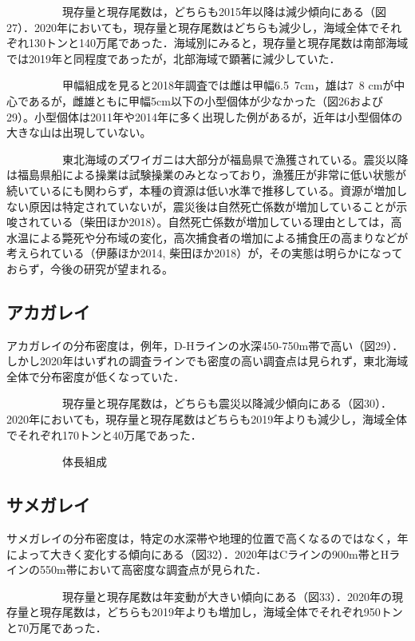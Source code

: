 \documentclass[11pt]{article} %
\begin{document}
\begin{linenumbers}
\ \ \ \ \ \ \ \ \ \ 
現存量と現存尾数は，どちらも2015年以降は減少傾向にある（図27）．2020年においても，現存量と現存尾数はどちらも減少し，海域全体でそれぞれ130トンと140万尾であった．海域別にみると，現存量と現存尾数は南部海域では2019年と同程度であったが，北部海域で顕著に減少していた．

\ \ \ \ \ \ \ \ \ \ 
甲幅組成を見ると2018年調査では雌は甲幅6.5~7cm，雄は7~8 cmが中心であるが，雌雄ともに甲幅5cm以下の小型個体が少なかった（図26および29）。小型個体は2011年や2014年に多く出現した例があるが，近年は小型個体の大きな山は出現していない。

\ \ \ \ \ \ \ \ \ \ 
東北海域のズワイガニは大部分が福島県で漁獲されている。震災以降は福島県船による操業は試験操業のみとなっており，漁獲圧が非常に低い状態が続いているにも関わらず，本種の資源は低い水準で推移している。資源が増加しない原因は特定されていないが，震災後は自然死亡係数が増加していることが示唆されている（柴田ほか2018）。自然死亡係数が増加している理由としては，高水温による斃死や分布域の変化，高次捕食者の増加による捕食圧の高まりなどが考えられている（伊藤ほか2014, 柴田ほか2018）が，その実態は明らかになっておらず，今後の研究が望まれる。

\subsection{アカガレイ}
アカガレイの分布密度は，例年，D-Hラインの水深450-750m帯で高い（図29）．しかし2020年はいずれの調査ラインでも密度の高い調査点は見られず，東北海域全体で分布密度が低くなっていた．

\ \ \ \ \ \ \ \ \ \ 
現存量と現存尾数は，どちらも震災以降減少傾向にある（図30）．2020年においても，現存量と現存尾数はどちらも2019年よりも減少し，海域全体でそれぞれ170トンと40万尾であった．

\ \ \ \ \ \ \ \ \ \ 
体長組成

\subsection{サメガレイ}
サメガレイの分布密度は，特定の水深帯や地理的位置で高くなるのではなく，年によって大きく変化する傾向にある（図32）．2020年はCラインの900m帯とHラインの550m帯において高密度な調査点が見られた．

\ \ \ \ \ \ \ \ \ \ 
現存量と現存尾数は年変動が大きい傾向にある（図33）．2020年の現存量と現存尾数は，どちらも2019年よりも増加し，海域全体でそれぞれ950トンと70万尾であった．


\end{linenumbers}
\end{document}
